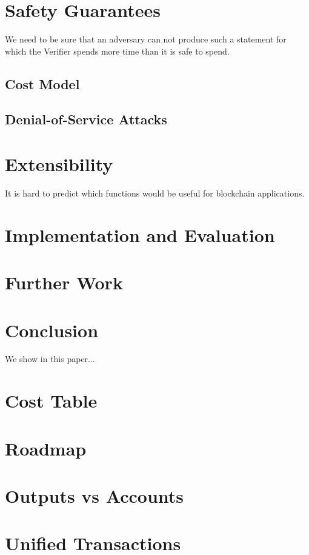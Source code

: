 \documentclass[11pt]{article}
\newcommand{\authnote}[2]{\marginpar{\parbox{\marginparwidth}{\tiny %
  \textsf{#1 {\textcolor{blue}{notes: #2}}}}}%
  \textcolor{blue}{\textbf{\dag}}}
\newcommand{\authnote}[2]{
  \textsf{#1 \textcolor{blue}{: #2}}}
\newcommand{\authnote}[2]{}
\newcommand{\knote}[1]{{\authnote{\textcolor{green}{kushti notes}}{#1}}}
\begin{document}
\section{Safety Guarantees}
\label{sec:safety}

We need to be sure that an adversary can not produce such a statement for which the Verifier spends more time than it is safe to spend.
\knote{links to verifier dilemma, orphan rates etc} 

\subsection{Cost Model}
\label{sec:cost-model}

\subsection{Denial-of-Service Attacks}

\section{Extensibility}

It is hard to predict which functions would be useful for blockchain applications.

\section{Implementation and Evaluation}

\section{Further Work}

\section{Conclusion}

We show in this paper...









\appendix

\section{Cost Table}

\section{Roadmap}

\section{Outputs vs Accounts}

\section{Unified Transactions}
\label{apx-unified}
\end{document}
